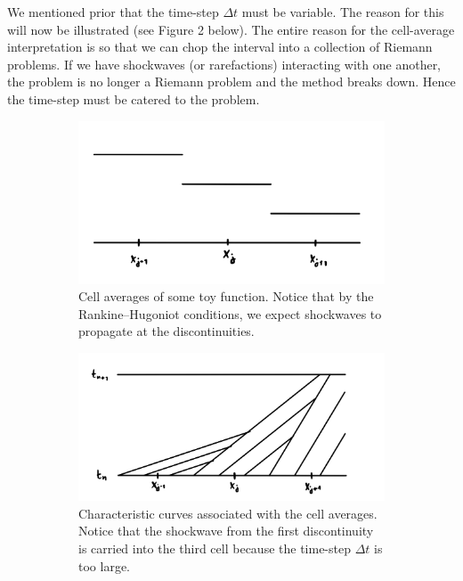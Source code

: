\documentclass{myproject}
\begin{document}
We mentioned prior that the time-step $\Delta t$ must be variable. The reason for this will now be illustrated (see Figure 2 below). The entire reason for the cell-average interpretation is so that we can chop the interval into a collection of Riemann problems. If we have shockwaves (or rarefactions) interacting with one another, the problem is no longer a Riemann problem and the method breaks down. Hence the time-step must be catered to the problem.
\begin{figure}[h]
    \centering
    \begin{subfigure}[b]{0.49\textwidth}
        \centering
        \includegraphics[width=\textwidth]{steps_for_shocks_crossing_cells.png}
        \caption{Cell averages of some toy function. Notice that by the Rankine–Hugoniot conditions, we expect shockwaves to propagate at the discontinuities.}
    \end{subfigure}\hfill
    \begin{subfigure}{0.49\textwidth}
        \centering
        \includegraphics[width=\textwidth]{shockwaves_crossing_multiple_cells.png}
        \caption{Characteristic curves associated with the cell averages. Notice that the shockwave from the first discontinuity is carried into the third cell because the time-step $\Delta t$ is too large.}
    \end{subfigure}
    \caption{}
\end{figure}
\end{document}
